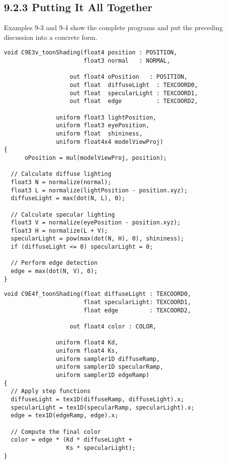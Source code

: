 \documentclass[../main.tex]{subfiles}
\begin{document}
\subsection{9.2.3 Putting It All Together}

Examples 9-3 and 9-4 show the complete programs and put the preceding discussion into a concrete form.

\FloatBarrier
\begin{lstlisting}[caption=Example 9-3. The \textbf{C9E3v_toonShading} Vertex Program]
void C9E3v_toonShading(float4 position : POSITION,
                       float3 normal   : NORMAL,

                   out float4 oPosition   : POSITION,
                   out float  diffuseLight  : TEXCOORD0,
                   out float  specularLight : TEXCOORD1,
                   out float  edge          : TEXCOORD2,

               uniform float3 lightPosition,
               uniform float3 eyePosition,
               uniform float  shininess,
               uniform float4x4 modelViewProj)
{
      oPosition = mul(modelViewProj, position);

  // Calculate diffuse lighting
  float3 N = normalize(normal);
  float3 L = normalize(lightPosition - position.xyz);
  diffuseLight = max(dot(N, L), 0);

  // Calculate specular lighting
  float3 V = normalize(eyePosition - position.xyz);
  float3 H = normalize(L + V);
  specularLight = pow(max(dot(N, H), 0), shininess);
  if (diffuseLight <= 0) specularLight = 0;

  // Perform edge detection
  edge = max(dot(N, V), 0);
}
\end{lstlisting}
\FloatBarrier

\FloatBarrier
\begin{lstlisting}[caption=Example 9-4. The \textbf{C9E4f_toonShading} Fragment Program]
void C9E4f_toonShading(float diffuseLight : TEXCOORD0,
                       float specularLight: TEXCOORD1,
                       float edge         : TEXCOORD2,

                   out float4 color : COLOR,

               uniform float4 Kd,
               uniform float4 Ks,
               uniform sampler1D diffuseRamp,
               uniform sampler1D specularRamp,
               uniform sampler1D edgeRamp)
{
  // Apply step functions
  diffuseLight = tex1D(diffuseRamp, diffuseLight).x;
  specularLight = tex1D(specularRamp, specularLight).x;
  edge = tex1D(edgeRamp, edge).x;

  // Compute the final color
  color = edge * (Kd * diffuseLight +
                  Ks * specularLight);
}
\end{lstlisting}
\FloatBarrier
\end{document}
